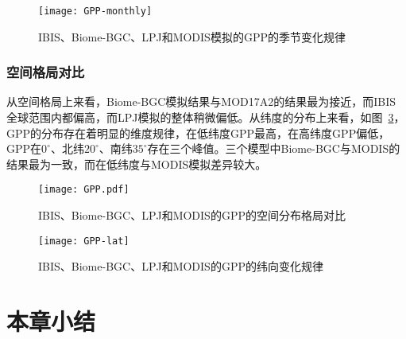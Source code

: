 \begin{figure}[!htbp]
    \centering
    \texttt{[image: GPP-monthly]}
    \caption{IBIS、Biome-BGC、LPJ和MODIS模拟的GPP的季节变化规律}
    \label{fig:GPP-monthly}
\end{figure}


\newpage
\subsubsection{空间格局对比}
从空间格局上来看，Biome-BGC模拟结果与MOD17A2的结果最为接近，而IBIS全球范围内都偏高，而LPJ模拟的整体稍微偏低。从纬度的分布上来看，如图~\ref{fig:GPP-lat}，GPP的分布存在着明显的维度规律，在低纬度GPP最高，在高纬度GPP偏低，GPP在$0^{\circ}$、北纬$20^{\circ}$、南纬$35^{\circ}$存在三个峰值。三个模型中Biome-BGC与MODIS的结果最为一致，而在低纬度与MODIS模拟差异较大。

\begin{figure}[!htbp]
    \centering
    \texttt{[image: GPP.pdf]}
    \caption{IBIS、Biome-BGC、LPJ和MODIS的GPP的空间分布格局对比}
    \label{fig:GPP}
\end{figure}

\begin{figure}[!htbp]
    \centering
    \texttt{[image: GPP-lat]}
    \caption{IBIS、Biome-BGC、LPJ和MODIS的GPP的纬向变化规律}
    \label{fig:GPP-lat}
\end{figure}

\section{本章小结}